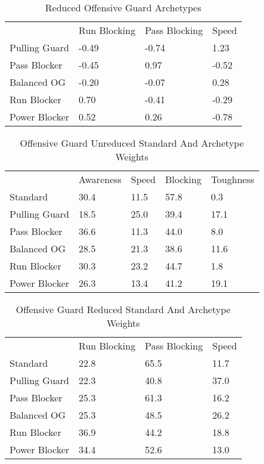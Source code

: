\documentclass[11pt]{article}
\begin{document}
\begin{table}[]
\centering
\caption{Reduced Offensive Guard Archetypes}
\label{ReducedOffensiveGuard}
\begin{tabular}{llll}
              & Run Blocking & Pass Blocking & Speed \\
Pulling Guard & -0.49        & -0.74         & 1.23  \\
Pass Blocker  & -0.45        & 0.97          & -0.52 \\
Balanced OG   & -0.20        & -0.07         & 0.28  \\
Run Blocker   & 0.70         & -0.41         & -0.29 \\
Power Blocker & 0.52         & 0.26          & -0.78
\end{tabular}
\end{table}

\begin{table}[]
\centering
\caption{Offensive Guard Unreduced Standard And Archetype Weights}
\label{OffensiveGuardUnreducedWeights}
\begin{tabular}{lllll}
              & Awareness & Speed & Blocking & Toughness \\
Standard      & 30.4      & 11.5  & 57.8     & 0.3       \\
Pulling Guard & 18.5      & 25.0  & 39.4     & 17.1      \\
Pass Blocker  & 36.6      & 11.3  & 44.0     & 8.0       \\
Balanced OG   & 28.5      & 21.3  & 38.6     & 11.6      \\
Run Blocker   & 30.3      & 23.2  & 44.7     & 1.8       \\
Power Blocker & 26.3      & 13.4  & 41.2     & 19.1     
\end{tabular}
\end{table}

\begin{table}[]
\centering
\caption{Offensive Guard Reduced Standard And Archetype Weights}
\label{OffensiveGuardReducedWeights}
\begin{tabular}{llll}
              & Run Blocking & Pass Blocking & Speed \\
Standard      & 22.8         & 65.5          & 11.7  \\
Pulling Guard & 22.3         & 40.8          & 37.0  \\
Pass Blocker  & 25.3         & 61.3          & 16.2  \\
Balanced OG   & 25.3         & 48.5          & 26.2  \\
Run Blocker   & 36.9         & 44.2          & 18.8  \\
Power Blocker & 34.4         & 52.6          & 13.0 
\end{tabular}
\end{table}
\end{document}
